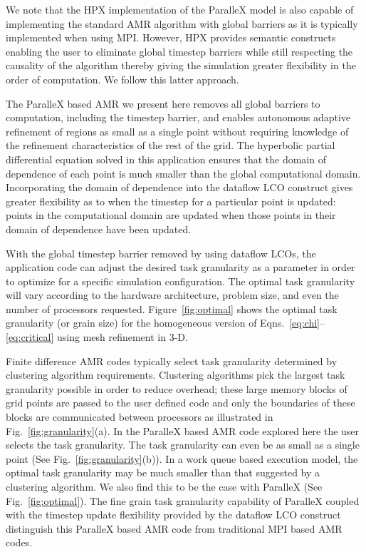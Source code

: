\documentclass{revtex4}
\begin{document}
We note that the HPX implementation of the ParalleX model is also capable of implementing the 
standard AMR algorithm with global barriers
as it is typically implemented when using MPI.
However, HPX provides semantic constructs enabling the user to eliminate global timestep barriers while still
respecting the causality of the algorithm thereby giving the simulation greater flexibility in the order of 
computation.  We follow this latter approach.

The ParalleX based AMR we present here removes all global barriers to computation, including the timestep barrier, and 
enables autonomous adaptive refinement of regions as small as a single point without requiring knowledge of 
the refinement characteristics of the rest of the grid.  The hyperbolic partial differential equation
solved in this application ensures that the domain of dependence of each point is much smaller
than the global computational domain.  Incorporating the domain of dependence 
into the dataflow LCO construct gives greater flexibility as to when the timestep for a particular point is 
updated: points in the computational domain are updated when those points in their domain of dependence have 
been updated.

With the global timestep barrier removed by using dataflow LCOs, the application code can adjust the 
desired task granularity as a parameter in order to optimize for a specific simulation configuration.  
The optimal task granularity will vary according to the hardware architecture, problem size, and even the number of
processors requested.  Figure~\ref{fig:optimal} shows the 
optimal task granularity (or grain size) for 
the homogeneous version of Eqns.~\ref{eq:chi}--\ref{eq:critical} using mesh refinement in 3-D.    

Finite difference AMR codes typically select task granularity determined by clustering algorithm requirements.
Clustering algorithms pick the largest task granularity possible in order to reduce overhead; these
large memory blocks of grid points are passed to the user defined code and only the boundaries 
of these blocks are 
communicated between processors as illustrated in Fig.~\ref{fig:granularity}(a).  
In the ParalleX based AMR code explored here the user selects the task granularity.  The task granularity
can even be as small as a single point (See Fig.~\ref{fig:granularity}(b)). 
In a work queue based execution model, the optimal task granularity may be much smaller than that
suggested by a clustering algorithm.  We also find this to be the case with ParalleX (See Fig.~\ref{fig:optimal}).
The fine grain task granularity capability of ParalleX coupled with the timestep update flexibility 
provided by the dataflow LCO construct distinguish this ParalleX based AMR code from traditional MPI based AMR codes.
\end{document}
